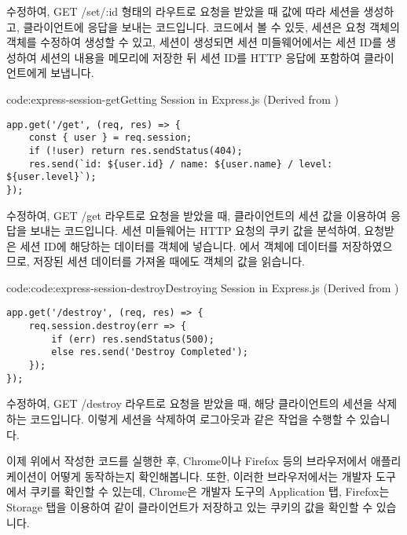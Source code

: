 \은 \를 수정하여, GET /set/:id 형태의 라우트로 요청을 받았을 때  값에 따라 세션을 생성하고, 클라이언트에 응답을 보내는 코드입니다. 코드에서 볼 수 있듯, 세션은 요청 객체의  객체를 수정하여 생성할 수 있고, 세션이 생성되면 세션 미들웨어에서는 세션 ID를 생성하여 세션의 내용을 메모리에 저장한 뒤 세션 ID를 HTTP 응답에 포함하여 클라이언트에게 보냅니다.

\begin{codeenv}{code:express-session-get}{Getting Session in Express.js (Derived from )}\begin{verbatim}
app.get('/get', (req, res) => {
    const { user } = req.session;
    if (!user) return res.sendStatus(404);
    res.send(`id: ${user.id} / name: ${user.name} / level: ${user.level}`);
});
\end{verbatim}
\end{codeenv}

\은 \를 수정하여, GET /get 라우트로 요청을 받았을 때, 클라이언트의 세션 값을 이용하여 응답을 보내는 코드입니다. 세션 미들웨어는 HTTP 요청의 쿠키 값을 분석하여, 요청받은 세션 ID에 해당하는 데이터를  객체에 넣습니다. 에서  객체에 데이터를 저장하였으므로, 저장된 세션 데이터를 가져올 때에도  객체의 값을 읽습니다.

\begin{codeenv}{code:code:express-session-destroy}{Destroying Session in Express.js (Derived from )}\begin{verbatim}
app.get('/destroy', (req, res) => {
    req.session.destroy(err => {
        if (err) res.sendStatus(500);
        else res.send('Destroy Completed');
    });
});
\end{verbatim}
\end{codeenv}

\는 \를 수정하여, GET /destroy 라우트로 요청을 받았을 때, 해당 클라이언트의 세션을 삭제하는 코드입니다. 이렇게 세션을 삭제하여 로그아웃과 같은 작업을 수행할 수 있습니다.

이제 위에서 작성한 코드를 실행한 후, Chrome이나 Firefox 등의 브라우저에서 애플리케이션이 어떻게 동작하는지 확인해봅니다. 또한, 이러한 브라우저에서는 개발자 도구에서 쿠키를 확인할 수 있는데, Chrome은 개발자 도구의 Application 탭, Firefox는 Storage 탭을 이용하여 \와 같이 클라이언트가 저장하고 있는 쿠키의 값을 확인할 수 있습니다.

